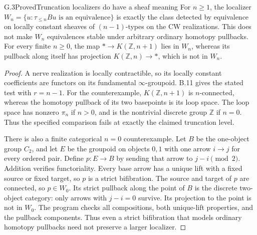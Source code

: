 \begin{statement}{G.3}{Proved}{Truncation localizers do have a sheaf meaning}
For $n\geq1$, the localizer
$W_n=\{u:\tau_{\leq n}Bu\text{ is an equivalence}\}$ is exactly the
class detected by equivalence on locally constant sheaves of
$(n-1)$-types on the CW realizations. This does not make $W_n$
equivalences stable under arbitrary ordinary homotopy pullbacks.
For every finite $n\geq0$, the map $*\to K(\mathbb Z,n+1)$ lies in
$W_n$, whereas its pullback along itself has projection
$K(\mathbb Z,n)\to *$, which is not in $W_n$.
\end{statement}
\begin{proof}
A nerve realization is locally contractible, so its locally constant
coefficients are functors on its fundamental $\infty$-groupoid. B.11
gives the stated test with $r=n-1$. For the counterexample,
$K(\mathbb Z,n+1)$ is $n$-connected, whereas the homotopy pullback of
its two basepoints is its loop space. The loop space has nonzero
$\pi_n$ if $n>0$, and is the nontrivial discrete group $\mathbb Z$ if
$n=0$. Thus the specified comparison fails at exactly the claimed
truncation level.

There is also a finite categorical $n=0$ counterexample. Let $B$ be the
one-object group $C_2$, and let $E$ be the groupoid on objects $0,1$
with one arrow $i\to j$ for every ordered pair. Define
$p:E\to B$ by sending that arrow to $j-i\pmod2$. Addition verifies
functoriality. Every base arrow has a unique lift with a fixed source
or fixed target, so $p$ is a strict bifibration. The source and target
of $p$ are connected, so $p\in W_0$. Its strict pullback along the
point of $B$ is the discrete two-object category: only arrows with
$j-i=0$ survive. Its projection to the point is not in $W_0$.
The program checks all compositions, both unique-lift properties, and
the pullback components. Thus even a strict bifibration that models
ordinary homotopy pullbacks need not preserve a larger localizer.
\end{proof}

